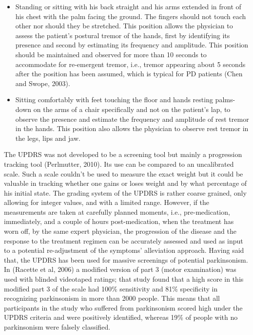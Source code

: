 \begin{itemize}
\item Standing or sitting with his back straight and his arms extended in front of his chest with the palm facing the ground. The fingers should not touch each other nor should they be stretched. This position allows the physician to assess the patient's postural tremor of the hands, first by identifying its presence and second by estimating its frequency and amplitude. This position should be maintained and observed for more than 10 seconds to accommodate for re-emergent tremor, i.e., tremor appearing about 5 seconds after the position has been assumed, which is typical for \gls{PD} patients (Chen and Swope, 2003). 
\item Sitting comfortably with feet touching the floor and hands resting palms-down on the arms of a chair specifically and not on the patient's lap, to observe the presence and estimate the frequency and amplitude of rest tremor in the hands. This position also allows the physician to observe rest tremor in the legs, lips and jaw.
\end{itemize}

The \gls{UPDRS} was not developed to be a screening tool but mainly a progression tracking tool (Perlmutter, 2010). Its use can be compared to an uncalibrated scale. Such a scale couldn't be used to measure the exact weight but it could be valuable in tracking whether one gains or loses weight and by what percentage of his initial state. The grading system of the \gls{UPDRS} is rather coarse grained, only allowing for integer values, and with a limited range. However, if the measurements are taken at carefully planned moments, i.e., pre-medication, immediately, and a couple of hours post-medication, when the treatment has worn off, by the same expert physician, the progression of the disease and the response to the treatment regimen can be accurately assessed and used as input to a potential re-adjustment of the symptoms' alleviation approach. Having said that, the \gls{UPDRS} has been used for massive screenings of potential parkinsonism. In (Racette et al, 2006) a modified version of part 3 (motor examination) was used with blinded videotaped ratings; that study found that a high score in this modified part 3 of the scale had 100\% sensitivity and 81\% specificity in recognizing parkinsonism in more than 2000 people. This means that all participants in the study who suffered from parkinsonism scored high under the \gls{UPDRS} criteria and were positively identified, whereas 19\% of people with no parkinsonism were falsely classified. 


